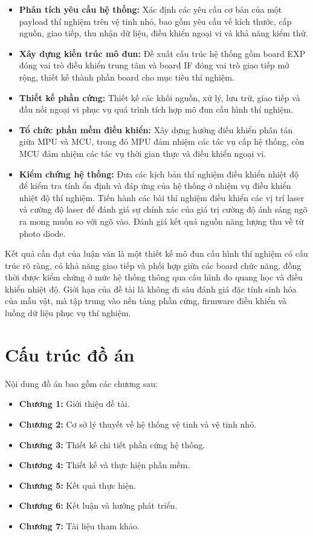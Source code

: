 \begin{itemize}
    \item \textbf{Phân tích yêu cầu hệ thống:} Xác định các yêu cầu cơ bản của một payload thí nghiệm trên vệ tinh nhỏ, bao gồm yêu cầu về kích thước, cấp nguồn, giao tiếp, thu nhận dữ liệu, điều khiển ngoại vi và khả năng kiểm thử.
    \item \textbf{Xây dựng kiến trúc mô đun:} Đề xuất cấu trúc hệ thống gồm board EXP đóng vai trò điều khiển trung tâm và board IF đóng vai trò giao tiếp mở rộng, thiết kế thành phần board cho mục tiêu thí nghiệm.
    \item \textbf{Thiết kế phần cứng:} Thiết kế các khối nguồn, xử lý, lưu trữ, giao tiếp và đầu nối ngoại vi phục vụ quá trình tích hợp mô đun cấu hình thí nghiệm.
    \item \textbf{Tổ chức phần mềm điều khiển:} Xây dựng hướng điều khiển phân tán giữa MPU và MCU, trong đó MPU đảm nhiệm các tác vụ cấp hệ thống, còn MCU đảm nhiệm các tác vụ thời gian thực và điều khiển ngoại vi.
    \item \textbf{Kiểm chứng hệ thống:} Đưa các kịch bản thí nghiệm điều khiển nhiệt độ để kiểm tra tính ổn định và đáp ứng của hệ thống ở nhiệm vụ điều khiển nhiệt độ thí nghiệm. Tiến hành các bài thí nghiệm điều khiển các vị trí laser và cường độ laser để đánh giá sự chính xác của giá trị cường độ ánh sáng ngõ ra mong muốn so với ngõ vào. Đánh giá kết quả nguồn năng lượng thu về từ photo diode.
\end{itemize}

Kết quả cần đạt của luận văn là một thiết kế mô đun cấu hình thí nghiệm có cấu trúc rõ ràng, có khả năng giao tiếp và phối hợp giữa các board chức năng, đồng thời được kiểm chứng ở mức hệ thống thông qua cấu hình đo quang học và điều khiển nhiệt độ. Giới hạn của đề tài là không đi sâu đánh giá đặc tính sinh hóa của mẫu vật, mà tập trung vào nền tảng phần cứng, firmware điều khiển và luồng dữ liệu phục vụ thí nghiệm.

\section{Cấu trúc đồ án}
\label{sec:cau_truc_do_an}

Nội dung đồ án bao gồm các chương sau:
\begin{itemize}
    \item \textbf{Chương 1:} Giới thiệu đề tài.
    \item \textbf{Chương 2:} Cơ sở lý thuyết về hệ thống vệ tinh và vệ tinh nhỏ.
    \item \textbf{Chương 3:} Thiết kế chi tiết phần cứng hệ thống.
    \item \textbf{Chương 4:} Thiết kế và thực hiện phần mềm.
    \item \textbf{Chương 5:} Kết quả thực hiện.
    \item \textbf{Chương 6:} Kết luận và hướng phát triển.
    \item \textbf{Chương 7:} Tài liệu tham khảo.
\end{itemize}
\newpage
